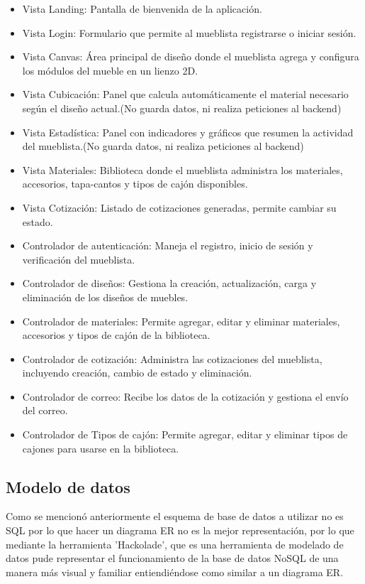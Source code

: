 ﻿\documentclass{iccmemoria}
\begin{document}
\begin{itemize}
    \item Vista Landing: Pantalla de bienvenida de la aplicación.
    \item Vista Login: Formulario que permite al mueblista registrarse o iniciar sesión.
    \item Vista Canvas: Área principal de diseño donde el mueblista agrega y configura los módulos del mueble en un lienzo 2D.
    \item Vista Cubicación: Panel que calcula automáticamente el material necesario según el diseño actual.(No guarda datos, ni realiza peticiones al backend)
    \item Vista Estadística: Panel con indicadores y gráficos que resumen la actividad del mueblista.(No guarda datos, ni realiza peticiones al backend)
    \item Vista Materiales: Biblioteca donde el mueblista administra los materiales, accesorios, tapa-cantos y tipos de cajón disponibles.
    \item Vista Cotización: Listado de cotizaciones generadas, permite cambiar su estado.
    \\
    \item Controlador de autenticación: Maneja el registro, inicio de sesión y verificación del mueblista.
    \item Controlador de diseños: Gestiona la creación, actualización, carga y eliminación de los diseños de muebles.
    \item Controlador de materiales: Permite agregar, editar y eliminar materiales, accesorios y tipos de cajón de la biblioteca.
    \item Controlador de cotización: Administra las cotizaciones del mueblista, incluyendo creación, cambio de estado y eliminación.
    \item Controlador de correo: Recibe los datos de la cotización y gestiona el envío del correo.
    \item Controlador de Tipos de cajón: Permite agregar, editar y eliminar tipos de cajones para usarse en la biblioteca.
\end{itemize}
\subsection{Modelo de datos}
Como se mencionó anteriormente el esquema de base de datos a utilizar no es SQL por lo que hacer un diagrama ER no es la mejor representación, por lo que mediante la herramienta 'Hackolade', que es una herramienta de modelado de datos pude representar el funcionamiento de la base de datos NoSQL de una manera más visual y familiar entiendiéndose como similar a un diagrama ER.
\end{document}
